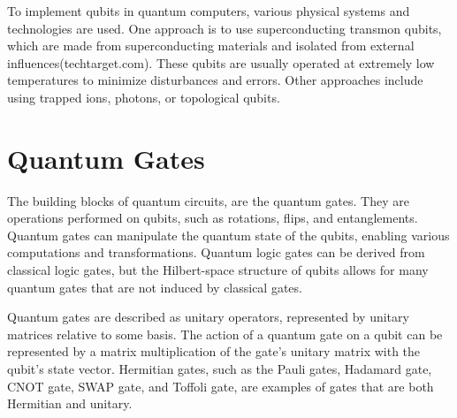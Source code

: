 \documentclass[inscr,ack,preface]{diphdthesis}
\begin{document}
To implement qubits in quantum computers, various physical systems and technologies are used. One approach is to use superconducting transmon qubits, which are made from superconducting materials and isolated from external influences(techtarget.com). These qubits are usually operated at extremely low temperatures to minimize disturbances and errors. Other approaches include using trapped ions, photons, or topological qubits.

\section{Quantum Gates}

The building blocks of quantum circuits, are the quantum gates. They are operations performed on qubits, such as rotations, flips, and entanglements. Quantum gates can manipulate the quantum state of the qubits, enabling various computations and transformations. Quantum logic gates can be derived from classical logic gates, but the Hilbert-space structure of qubits allows for many quantum gates that are not induced by classical gates.

Quantum gates are described as unitary operators, represented by unitary matrices relative to some basis. The action of a quantum gate on a qubit can be represented by a matrix multiplication of the gate's unitary matrix with the qubit's state vector. Hermitian gates, such as the Pauli gates, Hadamard gate, CNOT gate, SWAP gate, and Toffoli gate, are examples of gates that are both Hermitian and unitary.
\end{document}
